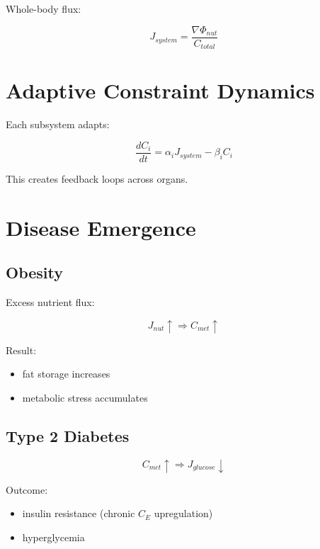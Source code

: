 \documentclass[11pt]{article}
\begin{document}
Whole-body flux:

\begin{equation}
J_{system} = \frac{\nabla \Phi_{nut}}{C_{total}}
\end{equation}

\section{Adaptive Constraint Dynamics}

Each subsystem adapts:

\begin{equation}
\frac{dC_i}{dt} = \alpha_i J_{system} - \beta_i C_i
\end{equation}

This creates feedback loops across organs.

\section{Disease Emergence}

\subsection{Obesity}

Excess nutrient flux:

\begin{equation}
J_{nut} \uparrow \Rightarrow C_{met} \uparrow
\end{equation}

Result:

\begin{itemize}
    \item fat storage increases
    \item metabolic stress accumulates
\end{itemize}

\subsection{Type 2 Diabetes}

\begin{equation}
C_{met} \uparrow \Rightarrow J_{glucose} \downarrow
\end{equation}

Outcome:

\begin{itemize}
    \item insulin resistance (chronic $C_E$ upregulation)
    \item hyperglycemia
\end{itemize}
\end{document}
